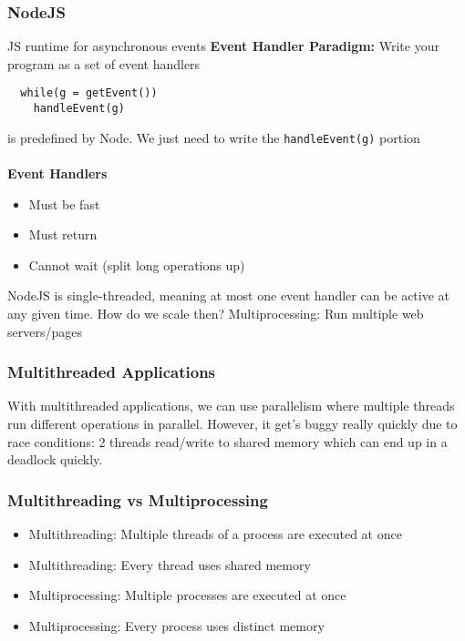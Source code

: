 \documentclass[13pt]{article}
\begin{document}
\subsubsection{NodeJS}
JS runtime for asynchronous events
\textbf{Event Handler Paradigm:} Write your program as a set of event handlers
\begin{verbatim}
  while(g = getEvent())
    handleEvent(g)
\end{verbatim}
is predefined by Node. We just need to write the \texttt{handleEvent(g)} portion \\ \\
\textbf{Event Handlers}
\begin{itemize}[leftmargin = 0pt]
\item [] Must be fast
\item [] Must return
\item [] Cannot wait (split long operations up)
\end{itemize}
NodeJS is single-threaded, meaning at most one event handler can be active at any given time. How do we scale then? Multiprocessing: Run multiple web servers/pages

\subsubsection{Multithreaded Applications}
With multithreaded applications, we can use parallelism where multiple threads run different operations in parallel. However, it get's buggy really quickly due to race conditions: 2 threads read/write to shared memory which can end up in a deadlock quickly.

\subsubsection{Multithreading vs Multiprocessing}
\begin{itemize}[leftmargin = 0pt]
\item [] Multithreading: Multiple threads of a process are executed at once
\item [] Multithreading: Every thread uses shared memory
\end{itemize}
\begin{itemize}[leftmargin = 0pt]
\item [] Multiprocessing: Multiple processes are executed at once
\item [] Multiprocessing: Every process uses distinct memory
\end{itemize}
\end{document}
